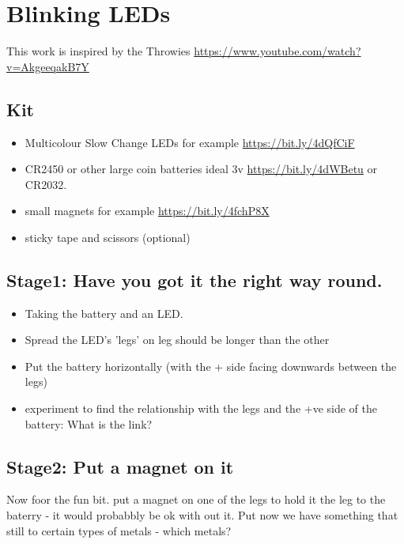 \chapter{Blinking LEDs}
This work is inspired by the Throwies \url{https://www.youtube.com/watch?v=AkgeeqakB7Y}

\section{Kit}
\begin{itemize}
    \item Multicolour Slow Change LEDs for example \url{https://bit.ly/4dQfCiF}
    \item CR2450 or other large coin batteries ideal 3v \url{https://bit.ly/4dWBetu} or CR2032.
    \item small magnets for example \url{https://bit.ly/4fchP8X}
    \item sticky tape and scissors (optional)
\end{itemize}
\section{Stage1: Have you got it the right way round.}
\begin{itemize}
    \item Taking the battery and an LED. 
    \item Spread the LED's 'legs' on leg should be longer than the other
    \item Put the battery horizontally (with the + side facing downwards between the legs)
    \item experiment to find the relationship with the legs and the +ve side of the battery: What is the link?
\end{itemize}

\section{Stage2: Put a magnet on it}
Now foor the fun bit. put a magnet on one of the legs to hold it the leg to the baterry - it would probabbly be ok with out it. Put now we have something that still to certain types of metals - which metals?





